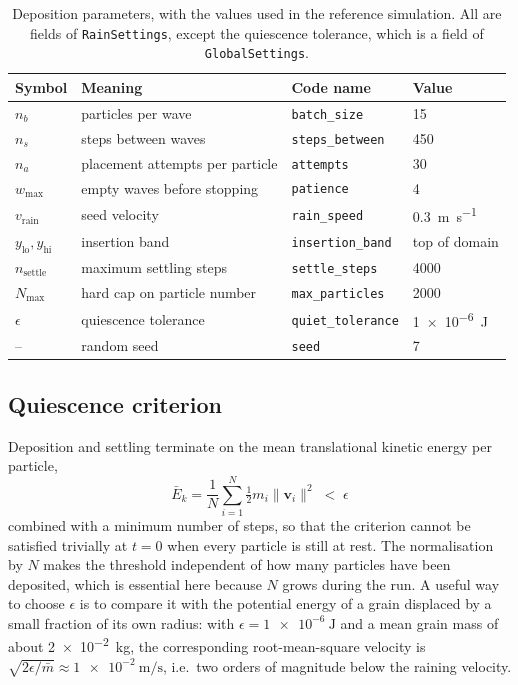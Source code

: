 \begin{table}[htbp]
  \centering
  \caption{Deposition parameters, with the values used in the reference
  simulation.  All are fields of \texttt{RainSettings}, except the quiescence
  tolerance, which is a field of \texttt{GlobalSettings}.}
  \label{tab:deposition}
  \begin{tabular}{llll}
    \toprule
    Symbol & Meaning & Code name & Value \\
    \midrule
    $n_{b}$            & particles per wave                & \texttt{batch\_size}     & 15 \\
    $n_{s}$            & steps between waves               & \texttt{steps\_between}  & 450 \\
    $n_{a}$            & placement attempts per particle   & \texttt{attempts}        & 30 \\
    $w_{\max}$         & empty waves before stopping       & \texttt{patience}        & 4 \\
    $v_{\text{rain}}$  & seed velocity                     & \texttt{rain\_speed}     & \qty{0.3}{\metre\per\second} \\
    $y_{\text{lo}},y_{\text{hi}}$ & insertion band         & \texttt{insertion\_band} & top of domain \\
    $n_{\text{settle}}$& maximum settling steps            & \texttt{settle\_steps}   & 4000 \\
    $N_{\max}$         & hard cap on particle number       & \texttt{max\_particles}  & 2000 \\
    $\epsilon$         & quiescence tolerance              & \texttt{quiet\_tolerance} & \qty{1e-6}{\joule} \\
    --                 & random seed                       & \texttt{seed}            & 7 \\
    \bottomrule
  \end{tabular}
\end{table}

\subsection{Quiescence criterion}

Deposition and settling terminate on the mean translational kinetic energy per
particle,
\begin{equation}
  \boxed{\;
  \bar{E}_{k}
  = \frac{1}{N}\sum_{i=1}^{N}\tfrac{1}{2}m_{i}\lVert\mathbf{v}_{i}\rVert^{2}
  \;<\; \epsilon \;}
  \label{eq:quiet}
\end{equation}
combined with a minimum number of steps, so that the criterion cannot be
satisfied trivially at $t=0$ when every particle is still at rest.  The
normalisation by $N$ makes the threshold independent of how many particles have
been deposited, which is essential here because $N$ grows during the run.  A
useful way to choose $\epsilon$ is to compare it with the potential energy of a
grain displaced by a small fraction of its own radius: with
$\epsilon=\qty{1e-6}{\joule}$ and a mean grain mass of about
\qty{2e-2}{\kilogram}, the corresponding root-mean-square velocity is
$\sqrt{2\epsilon/\bar{m}}\approx\qty{1e-2}{\metre\per\second}$, i.e.\ two orders
of magnitude below the raining velocity.

